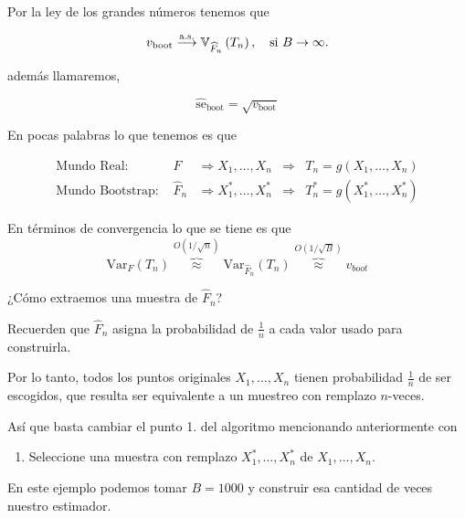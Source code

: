 \documentclass[
  12pt,
]{book}
\providecommand{\tightlist}{%
  \setlength{\itemsep}{0pt}\setlength{\parskip}{0pt}}
\theoremstyle{definition}
\theoremstyle{definition}
\theoremstyle{definition}
\theoremstyle{remark}
\let\BeginKnitrBlock\begin \let\EndKnitrBlock\end
\begin{document}
Por la ley de los grandes números tenemos que

\begin{equation}
v_{\mathrm{boot}} \stackrel{\mathrm{a.s.}}{\longrightarrow} \mathbb{V}_{\widehat{F}_{n}}\left(T_{n}\right), \text {\quad si } B \rightarrow \infty.
\end{equation}

además llamaremos,

\begin{equation*}
\widehat{\mathrm{se}}_{\mathrm{boot}}=\sqrt{v_{\mathrm{boot}}}
\end{equation*}

En pocas palabras lo que tenemos es que

\begin{align*}
\text  {Mundo Real: }
& F
& \Longrightarrow  X_{1}, \ldots, X_{n}
& \Longrightarrow
& T_{n} = g\left(X_{1}, \ldots, X_{n}\right) \\
\text {Mundo Bootstrap: }
& \widehat{F}_{n}
& \Longrightarrow  X_{1}^{*}, \ldots, X_{n}^{*}
& \Longrightarrow
& T_{n}^{*}=g\left(X_{1}^{*}, \ldots, X_{n}^{*}\right)
\end{align*}

En términos de convergencia lo que se tiene es que
\[
\mathrm{Var}_{F}\left(T_{n}\right) \overbrace{\approx}^{O(1 / \sqrt{n})} \mathrm{Var}_{\widehat{F}_{n}}\left(T_{n}\right) \overbrace{\approx}^{O(1 / \sqrt{B})} v_{b o o t}
\]

\BeginKnitrBlock{remark}
{}¿Cómo extraemos una muestra de \(\hat{F}_n\)?
\EndKnitrBlock{remark}

Recuerden que \(\hat{F}_{n}\) asigna la probabilidad de \(\frac{1}{n}\) a cada valor usado para construirla.

Por lo tanto, todos los puntos originales \(X_{1},\ldots,X_{n}\) tienen probabilidad \(\frac{1}{n}\) de ser escogidos, que resulta ser equivalente a un muestreo con remplazo \(n\)-veces.

Así que basta cambiar el punto 1. del algoritmo mencionando anteriormente con

\begin{enumerate}
\def\labelenumi{\arabic{enumi}.}
\tightlist
\item
  Seleccione una muestra con remplazo \(X_{1}^{*}, \ldots, X_{n}^{*}\) de \(X_{1},\ldots,X_{n}\).
\end{enumerate}

\BeginKnitrBlock{exercise}
\protect\hypertarget{exr:unnamed-chunk-87}{}{\label{exr:unnamed-chunk-87} }En este ejemplo podemos tomar \(B=1000\) y construir esa cantidad de veces nuestro estimador.
\EndKnitrBlock{exercise}
\end{document}
